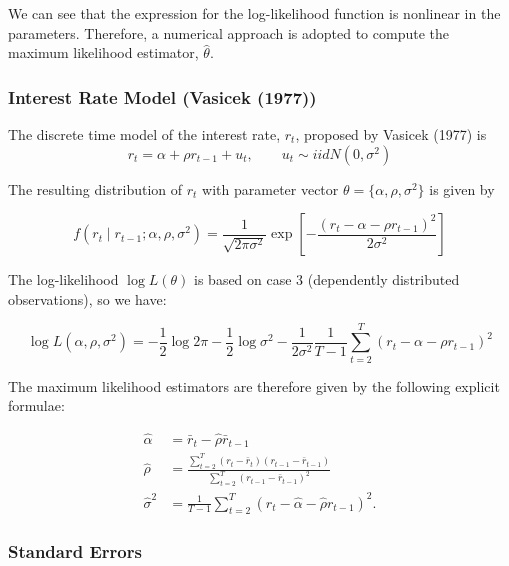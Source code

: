 \documentclass[11pt]{article}
\begin{document}
We can see that the expression for the log-likelihood function is nonlinear in the parameters. Therefore, a numerical approach is adopted to compute the maximum likelihood estimator, $\hat{\theta}$.


\subsubsection{Interest Rate Model (Vasicek (1977))}

The discrete time model of the interest rate, $r_t$, proposed by Vasicek (1977) is
\[r_t = \alpha + \rho r_{t-1} + u_t, \qquad u_t \sim iid N(0,\sigma^2)\]

The resulting distribution of $r_t$ with parameter vector $\theta = \{\alpha, \rho, \sigma^2\}$ is given by

\begin{equation}
f\left(r_t \mid r_{t-1} ; \alpha, \rho, \sigma^2\right)=\frac{1}{\sqrt{2 \pi \sigma^2}} \exp \left[-\frac{\left(r_t-\alpha-\rho r_{t-1}\right)^2}{2 \sigma^2}\right]
\end{equation}

The log-likelihood $\log L(\theta)$ is based on case 3 (dependently distributed observations), so we have:

\begin{equation}
\log L\left(\alpha, \rho, \sigma^2\right)=-\frac{1}{2} \log 2 \pi-\frac{1}{2} \log \sigma^2-\frac{1}{2 \sigma^2} \frac{1}{T-1} \sum_{t=2}^T\left(r_t-\alpha-\rho r_{t-1}\right)^2
\end{equation}

The maximum likelihood estimators are therefore given by the following explicit formulae:

\begin{equation}
\begin{aligned}
\widehat{\alpha} & =\bar{r}_t-\widehat{\rho} \bar{r}_{t-1} \\
\widehat{\rho} & =\frac{\sum_{t=2}^T\left(r_t-\bar{r}_t\right)\left(r_{t-1}-\bar{r}_{t-1}\right)}{\sum_{t=2}^T\left(r_{t-1}-\bar{r}_{t-1}\right)^2} \\
\widehat{\sigma}^2 & =\frac{1}{T-1} \sum_{t=2}^T\left(r_t-\widehat{\alpha}-\widehat{\rho} r_{t-1}\right)^2 .
\end{aligned}
\end{equation}


\subsubsection{Standard Errors}
\end{document}
